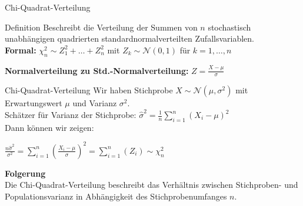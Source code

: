 \documentclass{beamer}
\begin{document}
	\begin{frame}{Chi-Quadrat-Verteilung}
		\begin{block}{Definition}
			Beschreibt die Verteilung der Summen von $n$ stochastisch unabhängigen quadrierten standardnormalverteilten Zufallsvariablen. \\ \vspace{2 ex}
			\textbf{Formal:} $\chi_n^2 \sim Z_1^2+ \dots + Z_n^2 $ mit $Z_k \sim \mathcal{N}(0,1)$ für $k=1, \dots , n$
		\end{block}
			\textbf{Normalverteilung zu Std.-Normalverteilung:} $Z = \frac{X-\mu}{\sigma}$ 
	\end{frame}
	
	\begin{frame}{Chi-Quadrat-Verteilung}
		Wir haben Stichprobe $X\sim \mathcal{N}(\mu,\sigma^2)$ mit Erwartungswert $\mu$ und Varianz $\sigma^2$.\\ \vspace{1ex} 
		Schätzer für Varianz der Stichprobe: $\hat{\sigma}^2 = \frac{1}{n} \sum_{i=1}^{n}(X_i-\mu)^2$ \\ \vspace{2ex}
		Dann können wir zeigen: \\
		\begin{center}
			$\frac{n\hat{\sigma}^2}{\sigma^2} = \sum_{i=1}^{n}(\frac{X_i-\mu}{\sigma})^2 =  \sum_{i=1}^{n}(Z_i) \sim \chi^2_n$
		\end{center}
		\textbf{Folgerung}\\
		Die Chi-Quadrat-Verteilung beschreibt das Verhältnis zwischen Stichproben- und Populationsvarianz in Abhängigkeit des Stichprobenumfanges $n$.
	\end{frame}
	
	
\end{document}

